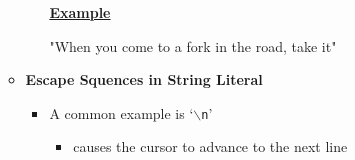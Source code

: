 \documentclass[12pt]{article}
\begin{document}
\begin{enumerate}[1.]
\begin{itemize}
\begin{itemize}
            \underline{\textbf{Example}}

            \bigskip

            "When you come to a fork in the road, take it"
        \end{itemize}

        \item \textbf{Escape Squences in String Literal}

        \begin{itemize}
            \item A common example is `\texttt{$\backslash$n}'

            \begin{itemize}
                \item causes the cursor to advance to the next line
            \end{itemize}
        \end{itemize}
    \end{itemize}
\end{enumerate}
\end{document}

